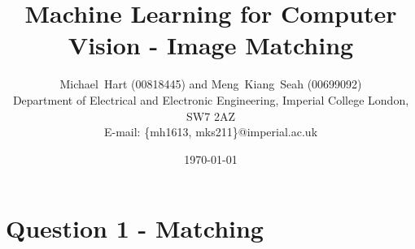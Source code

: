 \documentclass[a4paper, 10pt, conference]{ieeeconf}
\begin{document}
\title{Machine Learning for Computer Vision - Image Matching}
\author{Michael~Hart (00818445) and
        Meng~Kiang~Seah (00699092)
\\
        Department of Electrical and Electronic Engineering,
        Imperial College London,
        SW7 2AZ
\\
        E-mail: \{mh1613, mks211\}@imperial.ac.uk}
\date{\today}




\maketitle


%


\section{Question 1 - Matching}
\end{document}
